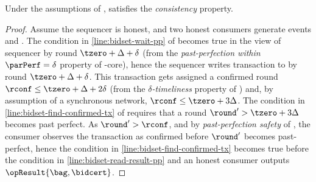 \begin{lemma}[Consistency]\label{lem:bidset-consistencys}
    Under the assumptions of ,  satisfies the \emph{consistency} property.
\end{lemma}
\begin{proof}
    Assume the sequencer is honest, and two honest consumers generate events  and .
    The condition in \cref{line:bidset-wait-pp} of  becomes true in the view of sequencer by round $\tzero + \Delta + \delta$ (from the \emph{past-perfection within $\parPerf=\delta$} property of \podtm-core),
    hence the sequencer writes transaction \msgbidresult{(\bag, \bidcert, \sigma)} to \podtm by round $\tzero + \Delta + \delta$.
    This transaction gets assigned a confirmed round $\rconf \leq \tzero + \Delta + 2\delta$ (from the \emph{$\delta$-timeliness} property of \podtm) and,
    by assumption of a synchronous network, $\rconf \leq \tzero + 3 \Delta$.
    The condition in \cref{line:bidset-find-confirmed-tx} of  requires that a round $\round' > \tzero + 3 \Delta$ becomes past perfect.
    As $\round' > \rconf$, and by \emph{past-perfection safety} of \podtm, the consumer observes the transaction as confirmed before $\round'$ becomes past-perfect, hence the condition in \cref{line:bidset-find-confirmed-tx} becomes true before the condition in \cref{line:bidset-read-result-pp} and an honest consumer outputs $\opResult{\bag, \bidcert}$.
\end{proof}


